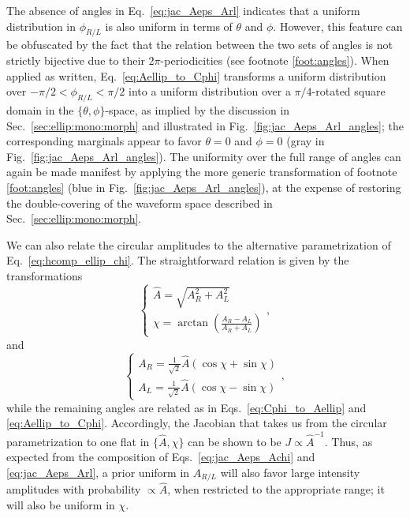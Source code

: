 \documentclass[aps,prd,twocolumn,superscriptaddress,preprintnumbers,floatfix,nofootinbib]{revtex4-2}
\newcommand*{\eq}[1]{Eq.~\eqref{eq:#1}}
\begin{document}
The absence of angles in \eq{jac_Aeps_Arl} indicates that a uniform distribution in $\phi_{R/L}$ is also uniform in terms of $\theta$ and $\phi$.
However, this feature can be obfuscated by the fact that the relation between the two sets of angles is not strictly bijective due to their $2\pi$-periodicities (see footnote \ref{foot:angles}).
When applied as written, \eq{Aellip_to_Cphi} transforms a uniform distribution over $-\pi/2 < \phi_{R/L} < \pi/2$ into a uniform distribution over a $\pi/4$-rotated square domain in the $\{\theta, \phi\}$-space, as implied by the discussion in Sec.~\ref{sec:ellip:mono:morph} and illustrated in Fig.~\ref{fig:jac_Aeps_Arl_angles}; the corresponding marginals appear to favor $\theta=0$ and $\phi = 0$ (gray in Fig.~\ref{fig:jac_Aeps_Arl_angles}).
The uniformity over the full range of angles can again be made manifest by applying the more generic transformation of footnote \ref{foot:angles} (blue in Fig.~\ref{fig:jac_Aeps_Arl_angles}), at the expense of restoring the double-covering of the waveform space described in Sec.~\ref{sec:ellip:mono:morph}.

We can also relate the circular amplitudes to the alternative parametrization of \eq{hcomp_ellip_chi}.
The straightforward relation is given by the transformations
\begin{equation} \label{eq:Cphi_to_Ahatchi}
\begin{cases}
\hat{A} = \sqrt{A_R^2 + A_L^2} \\
\chi = \arctan\left( \frac{A_R - A_L}{A_R + A_L}\right)
\end{cases} ,
\end{equation}
and
\begin{equation} \label{eq:Cphi_to_Ahatchi}
\begin{cases}
A_R = \frac{1}{\sqrt{2}} \hat{A} \left(\cos\chi + \sin \chi\right) \\
A_L = \frac{1}{\sqrt{2}} \hat{A} \left(\cos\chi - \sin \chi\right)
\end{cases} ,
\end{equation}
while the remaining angles are related as in Eqs.~\eqref{eq:Cphi_to_Aellip} and \eqref{eq:Aellip_to_Cphi}.
Accordingly, the Jacobian that takes us from the circular parametrization to one flat in $\{\hat{A},\chi\}$ can be shown to be $J \propto \hat{A}^{-1}$.
Thus, as expected from the composition of Eqs.~\eqref{eq:jac_Aeps_Achi} and \eqref{eq:jac_Aeps_Arl}, a prior uniform in $A_{R/L}$ will also favor large intensity amplitudes with probability $\propto \hat{A}$, when restricted to the appropriate range; it will also be uniform in $\chi$.
\end{document}
